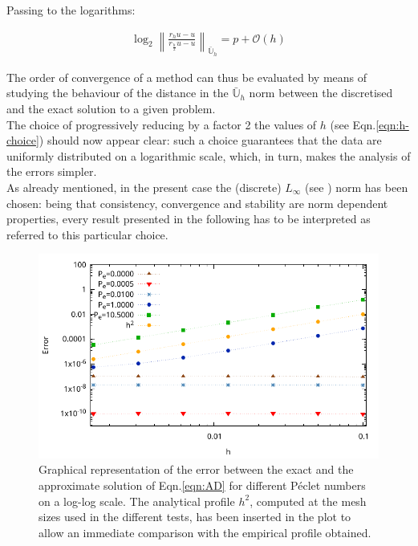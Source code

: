 \documentclass[11pt]{article}
\theoremstyle{theorem}
\theoremstyle{definition}
\begin{document}
Passing to the logarithms:

\begin{align}
	\label{eqn:log-conv}
	\log_2\left\|\frac{r_hu-u}{r_{\frac{h}{2}}u-u}\right\|_{\bar{\mathbb{U}}_h}=p+\mathcal{O}(h)
\end{align}

The order of convergence of a method can thus be evaluated by means of studying the behaviour of the distance in the $\bar{\mathbb{U}}_h$ norm between the discretised and the exact solution to a given problem.\\
The choice of progressively reducing by a factor 2 the values of $h$ (see Eqn.\eqref{eqn:h-choice}) should now appear clear: such a choice guarantees that the data are uniformly distributed on a logarithmic scale, which, in turn, makes the analysis of the errors simpler.\\
As already mentioned, in the present case the (discrete) $L_{\infty}$ (see \cite{lec-notes}) norm has been chosen: being that consistency, convergence and stability are norm dependent properties, every result presented in the following has to be interpreted as referred to this particular choice.\\

\begin{figure}[H]
	\begin{center}
		\includegraphics[width=1.0\textwidth]{ADRer.pdf}
	\end{center}
	\caption{Graphical representation of the error between the exact and the approximate solution of Eqn.\eqref{eqn:AD} for different P\'{e}clet numbers on a log-log scale. The analytical profile $h^2$, computed at the mesh sizes used in the different tests, has been inserted in the plot to allow an immediate comparison with the empirical profile obtained.
		\label{fig:errors}}
\end{figure}
\end{document}
